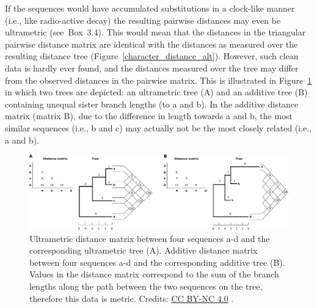 If the sequences would have accumulated substitutions in a clock-like manner (i.e., like radio-active decay) the resulting pairwise distances may even be ultrametric (see~Box~3.4).
This would mean that the distances in the triangular pairwise distance matrix are identical with the distances as measured over the resulting distance tree (Figure~\ref{character_distance_alt}).
However, such clean data is hardly ever found, and the distances measured over the tree may differ from the observed distances in the pairwise matrix.
This is illustrated in Figure~\ref{ultrametric_distance_alt} in which two trees are depicted: an ultrametric tree (A) and an additive tree (B) containing unequal sister branch lengths (to a and b).
In the additive distance matrix (matrix B), due to the difference in length towards a and b, the most similar sequences (i.e., b and c) may actually not be the most closely related (i.e., a and b).

% 

\begin{figure}[!htbp]
\centering
\includegraphics[width=1\linewidth]{files/ultrametric-distance-ddbcc8660c6e5afb67921cbbca262ddb.pdf}
\caption[]{Ultrametric distance matrix between four sequences a-d and the corresponding ultrametric tree (A).
Additive distance matrix between four sequences a-d and the corresponding additive tree (B).
Values in the distance matrix correspond to the sum of the branch lengths along the path between the two sequences on the tree, therefore this data is metric.
Credits: \href{https://creativecommons.org/licenses/by-nc/4.0/}{CC BY-NC 4.0} \cite{own_3_2024}.}
\label{ultrametric_distance_alt}
\end{figure}

